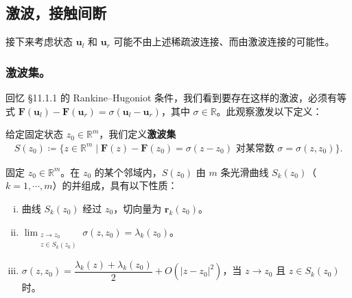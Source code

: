 \documentclass[../../main.tex]{subfiles}
\begin{document}
\subsection{激波，接触间断}\label{subsection:ch11-激波接触间断}

接下来考虑状态 $\mathbf{u}_l$ 和 $\mathbf{u}_r$ 可能不由上述稀疏波连接、而由激波连接的可能性。

\subsubsection*{激波集。} 回忆 \S11.1.1 的 Rankine--Hugoniot 条件，我们看到要存在这样的激波，必须有等式 $\mathbf{F}(\mathbf{u}_l)-\mathbf{F}(\mathbf{u}_r)=\sigma(\mathbf{u}_l-\mathbf{u}_r)$，其中 $\sigma\in\mathbb{R}$。此观察激发以下定义：

\begin{definition}\label{definition:ch11-激波集}
给定固定状态 $z_0\in\mathbb{R}^m$，我们定义\textbf{激波集}
\begin{align*}
S(z_0)\coloneqq\{z\in\mathbb{R}^m\mid\mathbf{F}(z)-\mathbf{F}(z_0)=\sigma(z-z_0)\text{ 对某常数 }\sigma=\sigma(z,z_0)\}.
\end{align*}
\end{definition}

\begin{theorem}[激波集的结构。]\label{theorem:ch11-激波集结构}固定 $z_0\in\mathbb{R}^m$。在 $z_0$ 的某个邻域内，$S(z_0)$ 由 $m$ 条光滑曲线 $S_k(z_0)$（$k=1,\cdots,m$）的并组成，具有以下性质：
\begin{enumerate}[(i)]
\item 曲线 $S_k(z_0)$ 经过 $z_0$，切向量为 $\mathbf{r}_k(z_0)$。
\item $\displaystyle\lim_{\substack{z\to z_0\\ z\in S_k(z_0)}}\sigma(z,z_0)=\lambda_k(z_0)$。
\item $\sigma(z,z_0)=\dfrac{\lambda_k(z)+\lambda_k(z_0)}{2}+O(|z-z_0|^2)$，当 $z\to z_0$ 且 $z\in S_k(z_0)$ 时。
\end{enumerate}
\end{theorem}
\end{document}
